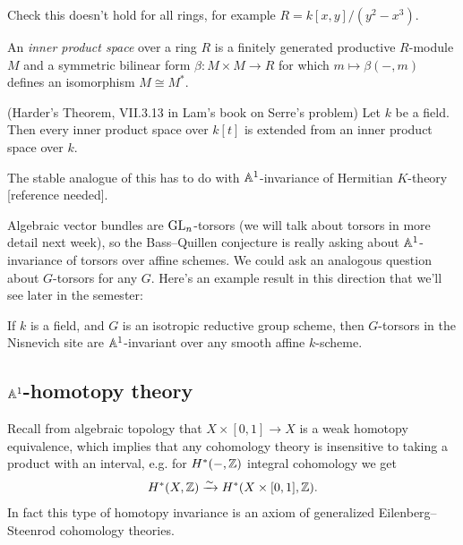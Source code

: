\documentclass[11pt]{amsart}
\begin{document}
\begin{example} \cite[3.7.1.5]{Aravind}
Check this doesn't hold for all rings, for example $R = k[x,y]/(y^2-x^3)$.
\end{example}

\begin{definition} An \textit{inner product space} over a ring $R$ is a finitely generated productive $R$-module $M$ and a symmetric bilinear form $\beta \colon M \times M \to R$ for which $m \mapsto \beta(-,m)$ defines an isomorphism $M \cong M^\ast$.
\end{definition}


\begin{theorem} (Harder's Theorem, VII.3.13 in Lam's book on Serre's problem) Let $k$ be a field. Then every inner product space over $k[t]$ is extended from an inner product space over $k$.
\end{theorem}

\begin{remark} The stable analogue of this has to do with $\mathbb{A}^1$-invariance of Hermitian $K$-theory [reference needed].
\end{remark}



Algebraic vector bundles are $\mathrm{GL}_n$-torsors (we will talk about torsors in more detail next week), so the Bass--Quillen conjecture is really asking about $\mathbb{A}^1$-invariance of torsors over affine schemes. We could ask an analogous question about $G$-torsors for any $G$. Here's an example result in this direction that we'll see later in the semester:

\begin{theorem} \cite[1.3]{AHW3} If $k$ is a field, and $G$ is an isotropic reductive group scheme, then $G$-torsors in the Nisnevich site are $\mathbb{A}^1$-invariant over any smooth affine $k$-scheme.
\end{theorem}

\subsection{$\mathbb{A}^1$-homotopy theory}

Recall from algebraic topology that $X \times [0,1] \to X$ is a weak homotopy equivalence, which implies that any cohomology theory is insensitive to taking a product with an interval, e.g. for $H^\ast(-,\mathbb{Z})$ integral cohomology we get
\begin{align*}
    H^\ast(X,\mathbb{Z}) \xrightarrow{\sim} H^\ast(X \times [0,1],\mathbb{Z}).
\end{align*}
In fact this type of homotopy invariance is an axiom of generalized Eilenberg--Steenrod cohomology theories.
\end{document}
